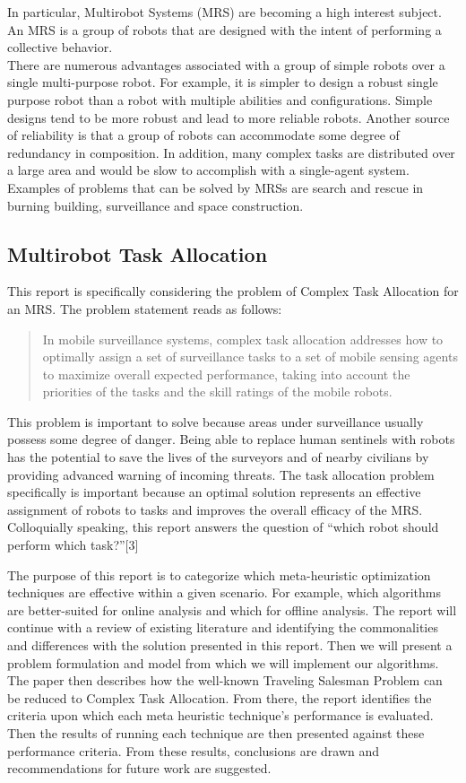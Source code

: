 \documentclass[a4paper]{article}
\begin{document}
In particular, Multirobot Systems (MRS) are becoming a high interest subject. An MRS is a group of robots that are designed with the intent of performing a collective behavior.\\
There are numerous advantages associated with a group of simple robots over a single multi-purpose robot. For example, it is simpler to design a robust single purpose robot than a robot with multiple abilities and configurations. Simple designs tend to be more robust and lead to more reliable robots. Another source of reliability is that a group of robots can accommodate some degree of redundancy in composition.  In addition, many complex tasks are distributed over a large area and would be slow to accomplish with a single-agent system. Examples of problems that can be solved by MRSs are search and rescue in burning building, surveillance and space construction.\\

\subsection{Multirobot Task Allocation}
This report is specifically considering the problem of Complex Task Allocation for an MRS. The problem statement reads as follows:\\
\blockquote{In mobile surveillance systems, complex task allocation addresses how to optimally assign a set of surveillance tasks to a set of mobile sensing agents to maximize overall expected performance, taking into account the priorities of the tasks and the skill ratings of the mobile robots.}
This problem is important to solve because areas under surveillance usually possess some degree of danger. Being able to replace human sentinels with robots has the potential to save the lives of the surveyors and of nearby civilians by providing advanced warning of incoming threats. The task allocation problem specifically is important because an optimal solution represents an effective assignment of robots to tasks and improves the overall efficacy of the MRS. Colloquially speaking, this report answers the question of ``which robot should perform which task?''[3]


The purpose of this report is to categorize which meta-heuristic optimization techniques are effective within a given scenario. For example, which algorithms are better-suited for online analysis and which for offline analysis.
The report will continue with a review of existing literature and identifying the commonalities and differences with the solution presented in this report. Then we will present a problem formulation and model from which we will implement our algorithms. The paper then describes how the well-known Traveling Salesman Problem can be reduced to Complex Task Allocation. From there, the report identifies the criteria upon which each meta heuristic technique's performance is evaluated. Then the results of running each technique are then presented against these performance criteria. From these results, conclusions are drawn and recommendations for future work are suggested.
\end{document}
